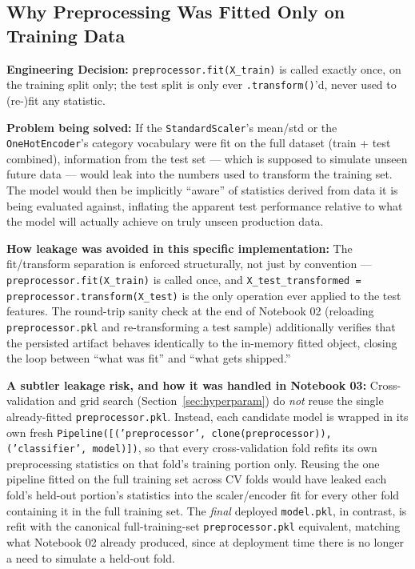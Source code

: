 \documentclass[11pt]{article}
\newcommand{\decision}[1]{%
\begin{decisionbox}
\textbf{\color{navy}Engineering Decision:} #1
\end{decisionbox}
}
\newcommand{\artifact}[1]{\texttt{\color{navy}#1}}
\begin{document}
\subsection{Why Preprocessing Was Fitted Only on Training Data}

\decision{\texttt{preprocessor.fit(X\_train)} is called exactly once, on the training split only; the test split is only ever \texttt{.transform()}'d, never used to (re-)fit any statistic.}

\textbf{Problem being solved:} If the \texttt{StandardScaler}'s mean/std or the \texttt{OneHotEncoder}'s category vocabulary were fit on the full dataset (train + test combined), information from the test set --- which is supposed to simulate unseen future data --- would leak into the numbers used to transform the training set. The model would then be implicitly ``aware'' of statistics derived from data it is being evaluated against, inflating the apparent test performance relative to what the model will actually achieve on truly unseen production data.

\textbf{How leakage was avoided in this specific implementation:} The fit/transform separation is enforced structurally, not just by convention --- \texttt{preprocessor.fit(X\_train)} is called once, and \texttt{X\_test\_transformed = preprocessor.transform(X\_test)} is the only operation ever applied to the test features. The round-trip sanity check at the end of Notebook 02 (reloading \artifact{preprocessor.pkl} and re-transforming a test sample) additionally verifies that the persisted artifact behaves identically to the in-memory fitted object, closing the loop between ``what was fit'' and ``what gets shipped.''

\textbf{A subtler leakage risk, and how it was handled in Notebook 03:} Cross-validation and grid search (Section~\ref{sec:hyperparam}) do \emph{not} reuse the single already-fitted \artifact{preprocessor.pkl}. Instead, each candidate model is wrapped in its own fresh \texttt{Pipeline([('preprocessor', clone(preprocessor)), ('classifier', model)])}, so that every cross-validation fold refits its own preprocessing statistics on that fold's training portion only. Reusing the one pipeline fitted on the full training set across CV folds would have leaked each fold's held-out portion's statistics into the scaler/encoder fit for every other fold containing it in the full training set. The \emph{final} deployed \artifact{model.pkl}, in contrast, is refit with the canonical full-training-set \artifact{preprocessor.pkl} equivalent, matching what Notebook 02 already produced, since at deployment time there is no longer a need to simulate a held-out fold.
\end{document}

